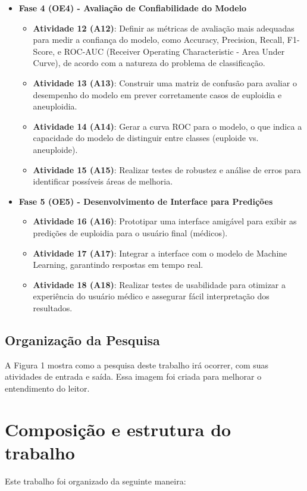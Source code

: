 \begin{itemize}
    \item \textbf{Fase 4 (OE4) - Avaliação de Confiabilidade do Modelo}
    \begin{itemize}
        \item \textbf{Atividade 12 (A12)}: Definir as métricas de avaliação mais adequadas para medir a confiança do modelo, como Accuracy, Precision, Recall, F1-Score, e ROC-AUC (Receiver Operating Characteristic - Area Under Curve), de acordo com a natureza do problema de classificação.
        \item \textbf{Atividade 13 (A13)}: Construir uma matriz de confusão para avaliar o desempenho do modelo em prever corretamente casos de euploidia e aneuploidia.
        \item \textbf{Atividade 14 (A14)}: Gerar a curva ROC para o modelo, o que indica a capacidade do modelo de distinguir entre classes (euploide vs. aneuploide).
        \item \textbf{Atividade 15 (A15)}: Realizar testes de robustez e análise de erros para identificar possíveis áreas de melhoria.
    \end{itemize}
    
    \item \textbf{Fase 5 (OE5) - Desenvolvimento de Interface para Predições}
    \begin{itemize}
        \item \textbf{Atividade 16 (A16)}: Prototipar uma interface amigável para exibir as predições de euploidia para o usuário final (médicos).
        \item \textbf{Atividade 17 (A17)}: Integrar a interface com o modelo de Machine Learning, garantindo respostas em tempo real.
        \item \textbf{Atividade 18 (A18)}: Realizar testes de usabilidade para otimizar a experiência do usuário médico e assegurar fácil interpretação dos resultados.
    \end{itemize}
\end{itemize}


\subsection{Organização da Pesquisa}
A Figura 1 mostra como a pesquisa deste trabalho irá ocorrer, com suas atividades de entrada e saída. Essa imagem foi criada para melhorar o entendimento do leitor.

\section{Composição e estrutura do trabalho}
Este trabalho foi organizado da seguinte maneira:

